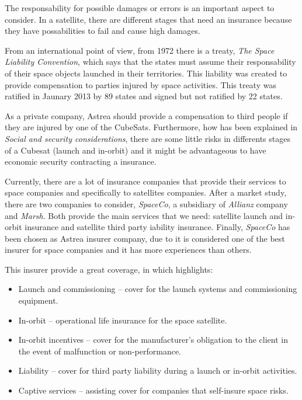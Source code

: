 The responsability for possible damages or errors is an important aspect to consider. In a satellite, there are different stages that need an insurance because they have possabilities to fail and cause high damages.

From an international point of view, from 1972 there is a treaty, \textit{The Space Liability Convention}, which says that the states must assume their responsability of their space objects launched in their territories. This liability was created to provide compensation to parties injured by space activities. This treaty was ratified in Jaunary 2013 by 89 states and signed but not ratified by 22 states. \cite{UN}

As a private company, Astrea should provide a compensation to third people if they are injured by one of the CubeSats. Furthermore,  how has been explained in \textit{Social and security considerations}, there are some little risks in differents stages of a Cubesat (launch and in-orbit) and it might be advantageous to have economic security contracting a insurance. 

Currently, there are a lot of insurance companies that provide their services to space companies and specifically to  satellites companies. After a market study, there are two companies to consider, \textit{SpaceCo}, a subsidiary of \textit{Allianz} company and \textit{Marsh}. Both provide the main services that we need: satellite launch and in-orbit insurance and satellite third party iability insurance. Finally, \textit{SpaceCo} has been chosen as Astrea insurer company, due to it is considered one of the best insurer for space companies and it has more experiences than others.

This insurer provide a great coverage, in which highlights:

\begin{itemize}

	\item Launch and commissioning – cover for the launch systems and commissioning equipment.
	\item In-orbit – operational life insurance for the space satellite.
	\item In-orbit incentives – cover for the manufacturer’s obligation to the client in the event of malfunction 		          or non-performance.
	\item Liability – cover for third party liability during a launch or in-orbit activities.
	\item Captive services – assisting cover for companies that self-insure space risks. \cite{allianz}

\end{itemize}

